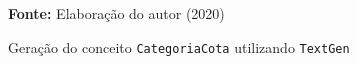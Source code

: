 \begin{figure}[ht!]
\centering

\caption{\textmd{Geração do conceito \texttt{CategoriaCota} utilizando \texttt{TextGen}}}
\label{fig:texgen}

\par\medskip\textbf{Fonte:} Elaboração do autor (2020) \par\medskip

\end{figure}

